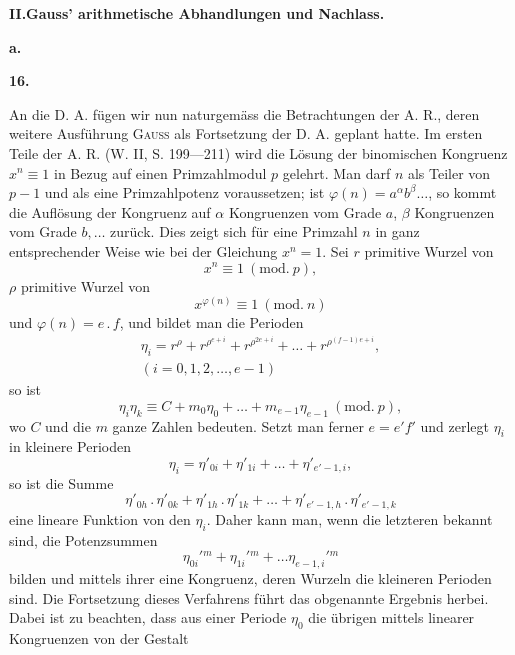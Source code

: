 \newpage{}
\begin{center}\bfseries II.\quad Gauss’ arithmetische Abhandlungen und Nachlass.\end{center}
\begin{center}\bfseries a.\quad{}\end{center}
\begin{center}\bfseries 16.\end{center}
\noindent\hspace*{\parindent}An die D. A. fügen wir nun naturgemäss die Betrachtungen der A. R., deren weitere Ausführung \textsc{Gauss} als Fortsetzung der D. A. geplant hatte. Im ersten Teile der A. R. (W. II, S. 199—211) wird die Lösung der binomischen Kongruenz \(x^n\equiv1\) in Bezug auf einen Primzahlmodul \(p\) gelehrt. Man darf \(n\) als Teiler von \(p-1\) und als eine Primzahlpotenz voraussetzen; ist \(\varphi(n)=a^\alpha b^\beta\ldots\), so kommt die Auflösung der Kongruenz auf \(\alpha\) Kongruenzen vom Grade \(a\), \(\beta\) Kongruenzen vom Grade \(b,\ldots\) zurück. Dies zeigt sich für eine Primzahl \(n\) in ganz entsprechender Weise wie bei der Gleichung \(x^n=1\). Sei \(r\) primitive Wurzel von
\[
x^n\equiv1\ (\mathrm{mod.}\ p),
\]
\(\rho\) primitive Wurzel von
\[
x^{\varphi(n)}\equiv1\ (\mathrm{mod.}\ n)
\]
und \(\varphi(n)=e\mathbin{.}f\), und bildet man die Perioden
\[
\begin{gathered}
\eta_i=r^\rho+r^{\rho^{e+i}}+r^{\rho^{2e+i}}+\ldots+r^{\rho^{(f-1)e+i}},\\
(i=0,1,2,\ldots,e-1)
\end{gathered}
\]
so ist
\[
\eta_i\eta_k\equiv C+m_0\eta_0+\ldots+m_{e-1}\eta_{e-1}\ (\mathrm{mod.}\ p),
\]
wo \(C\) und die \(m\) ganze Zahlen bedeuten. Setzt man ferner \(e=e'f'\) und zerlegt \(\eta_i\) in kleinere Perioden
\[
\eta_i=\eta'_{0i}+\eta'_{1i}+\ldots+\eta'_{e'-1,i},
\]
so ist die Summe
\[
\eta'_{0h}\mathbin{.}\eta'_{0k}+\eta'_{1h}\mathbin{.}\eta'_{1k}+\ldots+\eta'_{e'-1,h}\mathbin{.}\eta'_{e'-1,k}
\]
eine lineare Funktion von den \(\eta_i\). Daher kann man, wenn die letzteren bekannt sind, die Potenzsummen
\newpage{}
\[
\eta_{0i}'{}^m+\eta_{1i}'{}^m+\ldots\eta_{e-1,i}'{}^m
\]
bilden und mittels ihrer eine Kongruenz, deren Wurzeln die kleineren Perioden sind. Die Fortsetzung dieses Verfahrens führt das obgenannte Ergebnis herbei. Dabei ist zu beachten, dass aus einer Periode \(\eta_0\) die übrigen mittels linearer Kongruenzen von der Gestalt
